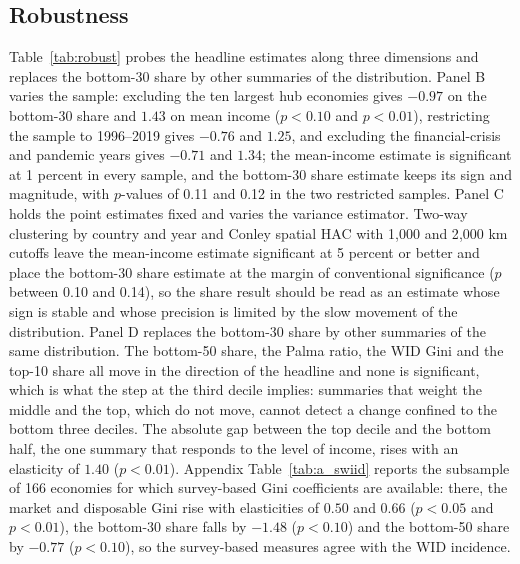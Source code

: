\subsection{Robustness}
\label{sec:robust}
Table~\ref{tab:robust} probes the headline estimates along three dimensions and replaces the bottom-30 share by other summaries of the distribution. Panel B varies the sample: excluding the ten largest hub economies gives $-0.97$ on the bottom-30 share and $1.43$ on mean income ($p<0.10$ and $p<0.01$), restricting the sample to 1996--2019 gives $-0.76$ and $1.25$, and excluding the financial-crisis and pandemic years gives $-0.71$ and $1.34$; the mean-income estimate is significant at 1 percent in every sample, and the bottom-30 share estimate keeps its sign and magnitude, with $p$-values of 0.11 and 0.12 in the two restricted samples. Panel C holds the point estimates fixed and varies the variance estimator. Two-way clustering by country and year and Conley spatial HAC with 1{,}000 and 2{,}000 km cutoffs \citep{Conley_1999} leave the mean-income estimate significant at 5 percent or better and place the bottom-30 share estimate at the margin of conventional significance ($p$ between 0.10 and 0.14), so the share result should be read as an estimate whose sign is stable and whose precision is limited by the slow movement of the distribution. Panel D replaces the bottom-30 share by other summaries of the same distribution. The bottom-50 share, the Palma ratio, the WID Gini and the top-10 share all move in the direction of the headline and none is significant, which is what the step at the third decile implies: summaries that weight the middle and the top, which do not move, cannot detect a change confined to the bottom three deciles. The absolute gap between the top decile and the bottom half, the one summary that responds to the level of income, rises with an elasticity of $1.40$ ($p<0.01$). Appendix Table~\ref{tab:a_swiid} reports the subsample of 166 economies for which survey-based Gini coefficients are available: there, the market and disposable Gini rise with elasticities of $0.50$ and $0.66$ ($p<0.05$ and $p<0.01$), the bottom-30 share falls by $-1.48$ ($p<0.10$) and the bottom-50 share by $-0.77$ ($p<0.10$), so the survey-based measures agree with the WID incidence.



